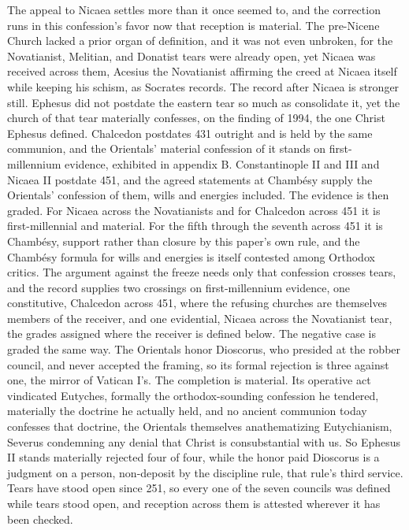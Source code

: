 \documentclass[11pt,twoside]{article}
\newcommand{\unit}[1]{\needspace{3\baselineskip}\par\medskip{\normalfont\bfseries\color{subhead}#1}\par\nobreak\smallskip}
\begin{document}
\unit{The receiver in history.}
The appeal to Nicaea settles more than it once seemed to, and the correction runs in this confession's favor now that reception is material. The pre-Nicene Church lacked a prior organ of definition, and it was not even unbroken, for the Novatianist, Melitian, and Donatist tears were already open, yet Nicaea was received across them, Acesius the Novatianist affirming the creed at Nicaea itself while keeping his schism, as Socrates records. The record after Nicaea is stronger still. Ephesus did not postdate the eastern tear so much as consolidate it, yet the church of that tear materially confesses, on the finding of 1994, the one Christ Ephesus defined. Chalcedon postdates 431 outright and is held by the same communion, and the Orientals' material confession of it stands on first-millennium evidence, exhibited in appendix B. Constantinople II and III and Nicaea II postdate 451, and the agreed statements at Chambésy supply the Orientals' confession of them, wills and energies included. The evidence is then graded. For Nicaea across the Novatianists and for Chalcedon across 451 it is first-millennial and material. For the fifth through the seventh across 451 it is Chambésy, support rather than closure by this paper's own rule, and the Chambésy formula for wills and energies is itself contested among Orthodox critics. The argument against the freeze needs only that confession crosses tears, and the record supplies two crossings on first-millennium evidence, one constitutive, Chalcedon across 451, where the refusing churches are themselves members of the receiver, and one evidential, Nicaea across the Novatianist tear, the grades assigned where the receiver is defined below. The negative case is graded the same way. The Orientals honor Dioscorus, who presided at the robber council, and never accepted the framing, so its formal rejection is three against one, the mirror of Vatican I's. The completion is material. Its operative act vindicated Eutyches, formally the orthodox-sounding confession he tendered, materially the doctrine he actually held, and no ancient communion today confesses that doctrine, the Orientals themselves anathematizing Eutychianism, Severus condemning any denial that Christ is consubstantial with us. So Ephesus II stands materially rejected four of four, while the honor paid Dioscorus is a judgment on a person, non-deposit by the discipline rule, that rule's third service. Tears have stood open since 251, so every one of the seven councils was defined while tears stood open, and reception across them is attested wherever it has been checked.
\end{document}
